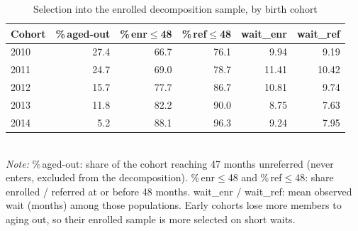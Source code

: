 \begin{table}[htbp]\centering
\caption{Selection into the enrolled decomposition sample, by birth cohort}
\label{tab:D4}
\footnotesize
\setlength{\tabcolsep}{4pt}
\begin{tabular}{lrrrrr}
\toprule
Cohort & \%\,aged-out & \%\,enr$\le$48 & \%\,ref$\le$48 & wait\_enr & wait\_ref \\
\midrule
2010 & 27.4 & 66.7 & 76.1 & 9.94 & 9.19 \\
2011 & 24.7 & 69.0 & 78.7 & 11.41 & 10.42 \\
2012 & 15.7 & 77.7 & 86.7 & 10.81 & 9.74 \\
2013 & 11.8 & 82.2 & 90.0 & 8.75 & 7.63 \\
2014 & 5.2 & 88.1 & 96.3 & 9.24 & 7.95 \\
\bottomrule
\end{tabular}
\\[3pt]{\footnotesize \textit{Note:} \%\,aged-out: share of the cohort reaching 47 months unreferred (never enters, excluded from the decomposition). \%\,enr$\le$48 and \%\,ref$\le$48: share enrolled / referred at or before 48 months. wait\_enr / wait\_ref: mean observed wait (months) among those populations. Early cohorts lose more members to aging out, so their enrolled sample is more selected on short waits.}
\end{table}
